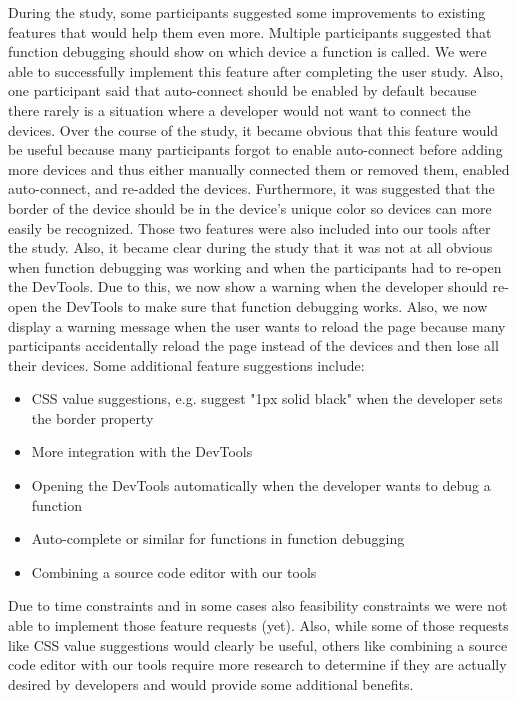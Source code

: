 During the study, some participants suggested some improvements to existing features that would help them even more. Multiple participants suggested that function debugging should show on which device a function is called. We were able to successfully implement this feature after completing the user study. Also, one participant said that auto-connect should be enabled by default because there rarely is a situation where a developer would not want to connect the devices. Over the course of the study, it became obvious that this feature would be useful because many participants forgot to enable auto-connect before adding more devices and thus either manually connected them or removed them, enabled auto-connect, and re-added the devices. Furthermore, it was suggested that the border of the device should be in the device's unique color so devices can more easily be recognized. Those two features were also included into our tools after the study. Also, it became clear during the study that it was not at all obvious when function debugging was working and when the participants had to re-open the DevTools. Due to this, we now show a warning when the developer should re-open the DevTools to make sure that function debugging works. Also, we now display a warning message when the user wants to reload the page because many participants accidentally reload the page instead of the devices and then lose all their devices. Some additional feature suggestions include:
\begin{itemize}
	\item CSS value suggestions, e.g. suggest "1px solid black" when the developer sets the border property
	\item More integration with the DevTools
	\item Opening the DevTools automatically when the developer wants to debug a function
	\item Auto-complete or similar for functions in function debugging
	\item Combining a source code editor with our tools
\end{itemize}
Due to time constraints and in some cases also feasibility constraints we were not able to implement those feature requests (yet). Also, while some of those requests like CSS value suggestions would clearly be useful, others like combining a source code editor with our tools require more research to determine if they are actually desired by developers and would provide some additional benefits.